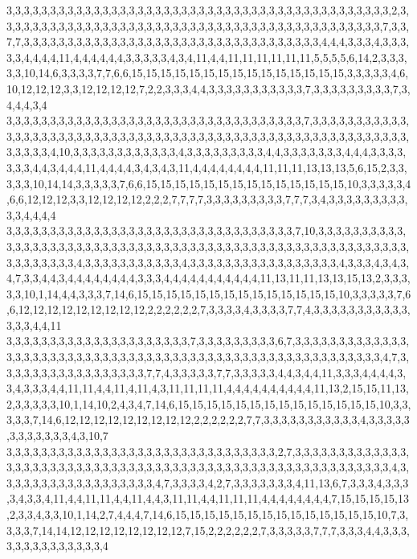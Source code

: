 3,3,3,3,3,3,3,3,3,3,3,3,3,3,3,3,3,3,3,3,3,3,3,3,3,3,3,3,3,3,3,3,3,3,3,3,3,3,3,3,3,3,3,3,2,3,3,3,3,3,3,3,3,3,3,3,3,3,3,3,3,3,3,3,3,3,3,3,3,3,3,3,3,3,3,3,3,3,3,3,3,3,3,3,3,3,3,3,3,7,3,3,7,7,3,3,3,3,3,3,3,3,3,3,3,3,3,3,3,3,3,3,3,3,3,3,3,3,3,3,3,3,3,3,3,3,3,3,4,4,4,3,3,3,4,3,3,3,3,3,4,4,4,4,11,4,4,4,4,4,4,3,3,3,3,3,4,3,4,11,4,4,11,11,11,11,11,11,5,5,5,5,6,14,2,3,3,3,3,3,10,14,6,3,3,3,3,7,7,6,6,15,15,15,15,15,15,15,15,15,15,15,15,15,15,15,3,3,3,3,3,4,6,10,12,12,12,3,3,12,12,12,12,7,2,2,3,3,3,4,4,3,3,3,3,3,3,3,3,3,3,3,7,3,3,3,3,3,3,3,3,3,7,3,4,4,4,3,4
3,3,3,3,3,3,3,3,3,3,3,3,3,3,3,3,3,3,3,3,3,3,3,3,3,3,3,3,3,3,3,3,3,3,7,3,3,3,3,3,3,3,3,3,3,3,3,3,3,3,3,3,3,3,3,3,3,3,3,3,3,3,3,3,3,3,3,3,3,3,3,3,3,3,3,3,3,3,3,3,3,3,3,3,3,3,3,3,3,3,3,3,3,3,3,3,3,4,10,3,3,3,3,3,3,3,3,3,3,3,3,4,3,3,3,3,3,3,3,3,3,4,4,3,3,3,3,3,3,3,4,4,4,3,3,3,3,3,3,3,4,4,3,4,4,4,11,4,4,4,4,3,4,3,4,3,11,4,4,4,4,4,4,4,4,11,11,11,13,13,13,5,6,15,2,3,3,3,3,3,10,14,14,3,3,3,3,3,7,6,6,15,15,15,15,15,15,15,15,15,15,15,15,15,15,10,3,3,3,3,3,4,6,6,12,12,12,3,3,12,12,12,12,2,2,2,7,7,7,7,3,3,3,3,3,3,3,3,3,7,7,7,3,4,3,3,3,3,3,3,3,3,3,3,3,4,4,4,4
3,3,3,3,3,3,3,3,3,3,3,3,3,3,3,3,3,3,3,3,3,3,3,3,3,3,3,3,3,3,3,3,3,7,10,3,3,3,3,3,3,3,3,3,3,3,3,3,3,3,3,3,3,3,3,3,3,3,3,3,3,3,3,3,3,3,3,3,3,3,3,3,3,3,3,3,3,3,3,3,3,3,3,3,3,3,3,3,3,3,3,3,3,3,3,3,3,3,3,4,3,3,3,3,3,3,3,3,3,3,3,4,3,3,3,3,3,3,3,3,3,3,3,3,3,3,3,3,3,4,3,3,3,4,3,4,3,4,7,3,3,4,4,3,4,4,4,4,4,4,4,4,3,3,3,4,4,4,4,4,4,4,4,4,4,4,11,13,11,11,13,13,15,13,2,3,3,3,3,3,10,1,14,4,4,3,3,3,7,14,6,15,15,15,15,15,15,15,15,15,15,15,15,15,15,10,3,3,3,3,3,7,6,6,12,12,12,12,12,12,12,12,12,2,2,2,2,2,2,7,3,3,3,3,4,3,3,3,3,7,7,4,3,3,3,3,3,3,3,3,3,3,3,3,3,3,4,4,11
3,3,3,3,3,3,3,3,3,3,3,3,3,3,3,3,3,3,3,3,3,7,3,3,3,3,3,3,3,3,3,6,7,3,3,3,3,3,3,3,3,3,3,3,3,3,3,3,3,3,3,3,3,3,3,3,3,3,3,3,3,3,3,3,3,3,3,3,3,3,3,3,3,3,3,3,3,3,3,3,3,3,3,3,3,3,3,3,3,4,7,3,3,3,3,3,3,3,3,3,3,3,3,3,3,3,3,3,7,7,4,3,3,3,3,3,7,7,3,3,3,3,3,4,4,3,4,4,11,3,3,3,4,4,4,4,3,3,4,3,3,3,4,4,11,11,4,4,11,4,11,4,3,11,11,11,11,4,4,4,4,4,4,4,4,4,4,11,13,2,15,15,11,13,2,3,3,3,3,3,10,1,14,10,2,4,3,4,7,14,6,15,15,15,15,15,15,15,15,15,15,15,15,15,15,10,3,3,3,3,3,7,14,6,12,12,12,12,12,12,12,12,12,2,2,2,2,2,2,7,7,3,3,3,3,3,3,3,3,3,3,3,4,3,3,3,3,3,3,3,3,3,3,3,3,4,3,10,7
3,3,3,3,3,3,3,3,3,3,3,3,3,3,3,3,3,3,3,3,3,3,3,3,3,3,3,3,3,3,3,2,7,3,3,3,3,3,3,3,3,3,3,3,3,3,3,3,3,3,3,3,3,3,3,3,3,3,3,3,3,3,3,3,3,3,3,3,3,3,3,3,3,3,3,3,3,3,3,3,3,3,3,3,3,3,3,3,3,3,4,3,3,3,3,3,3,3,3,3,3,3,3,3,3,3,3,3,3,4,7,3,3,3,3,4,2,7,3,3,3,3,3,3,3,4,11,13,6,7,3,3,3,4,3,3,3,3,4,3,3,4,11,4,4,11,11,4,4,11,4,4,3,11,11,4,4,11,11,11,4,4,4,4,4,4,4,4,7,15,15,15,15,13,2,3,3,4,3,3,10,1,14,2,7,4,4,4,7,14,6,15,15,15,15,15,15,15,15,15,15,15,15,15,15,10,7,3,3,3,3,7,14,14,12,12,12,12,12,12,12,12,7,15,2,2,2,2,2,2,7,3,3,3,3,3,7,7,7,3,3,3,4,4,3,3,3,3,3,3,3,3,3,3,3,3,3,3,4
